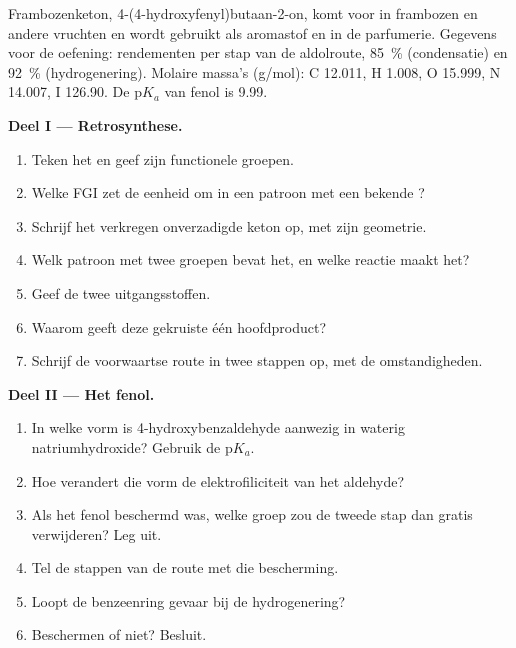 \begin{problem}
\label{pb:b2:retrosynthesis:1}
Frambozenketon, 4-(4-hydroxyfenyl)butaan-2-on, komt voor in frambozen en andere vruchten en wordt gebruikt
als aromastof en in de parfumerie. Gegevens voor de oefening: rendementen per stap van de aldolroute, 85~\% (condensatie)
en 92~\% (hydrogenering). Molaire massa's (\unit{g/mol}): C 12.011, H 1.008, O 15.999, N 14.007,
I 126.90. De $\mathrm pK_a$ van fenol is 9.99.

\medskip
\noindent\textbf{Deel I --- Retrosynthese.}
\begin{enumerate}
  \item Teken het  en geef zijn functionele groepen.
  \item Welke FGI zet de eenheid  om in een patroon met een bekende ?
  \item Schrijf het verkregen onverzadigde keton op, met zijn geometrie.
  \item Welk patroon met twee groepen bevat het, en welke reactie maakt het?
  \item Geef de twee uitgangsstoffen.
  \item Waarom geeft deze gekruiste  één hoofdproduct?
  \item Schrijf de voorwaartse route in twee stappen op, met de omstandigheden.
\end{enumerate}

\medskip
\noindent\textbf{Deel II --- Het fenol.}
\begin{enumerate}[resume]
  \item In welke vorm is 4-hydroxybenzaldehyde aanwezig in waterig natriumhydroxide? Gebruik de
        $\mathrm pK_a$.
  \item Hoe verandert die vorm de elektrofiliciteit van het aldehyde?
  \item Als het fenol beschermd was, welke groep zou de tweede stap dan gratis verwijderen? Leg uit.
  \item Tel de stappen van de route met die bescherming.
  \item Loopt de benzeenring gevaar bij de hydrogenering?
  \item Beschermen of niet? Besluit.
\end{enumerate}


\end{problem}
